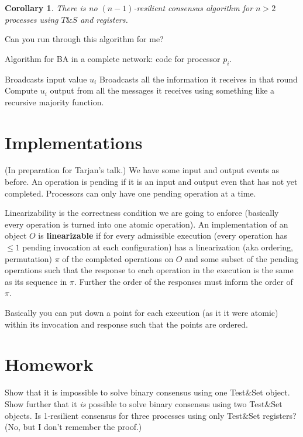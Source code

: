 \documentclass[twoside]{article}
\newtheorem{corollary}[theorem]{Corollary}
\begin{document}
\begin{corollary}
There is no $(n-1)$-resilient consensus algorithm for $n > 2$ processes using $T\&S$ and registers.
\end{corollary}
Can you run through this algorithm for me?

\begin{algorithm}
	\caption{Algorithm for BA in a complete network: code for processor $p_i$.}
    \label{pseudocode:BAExpBit}
    \begin{algorithmic}[1]
    \State Broadcasts input value $u_i$
    	\State Broadcasts all the information it receives in that round
    \EndFor
    \State Compute $u_i$ output from all the messages it receives using something like a recursive majority function.
    \end{algorithmic}
\end{algorithm}

\section{Implementations}
(In preparation for Tarjan's talk.) We have some input and output events as before. An operation is pending if it is an input and output even that has not yet completed. Processors can only have one pending operation at a time. 

Linearizability is the correctness condition we are going to enforce (basically every operation is turned into one atomic operation). An implementation of an object $O$ is \textbf{linearizable} if for every admissible execution (every operation has $\leq 1$ pending invocation at each configuration) has a linearization (aka ordering, permutation) $\pi$ of the completed operations on $O$ and some subset of the pending operations such that the response to each operation in the execution is the same as its sequence in $\pi$. Further the order of the responses must inform the order of $\pi$. 

Basically you can put down a point for each execution (as it it were atomic) within its invocation and response such that the points are ordered.

\section{Homework}
Show that it is impossible to solve binary consensus using one Test$\&$Set object. Show further that it \emph{is} possible to solve binary consensus using two Test$\&$Set objects. Is 1-resilient consensus for three processes using only Test$\&$Set registers? (No, but I don't remember the proof.)
\end{document}

